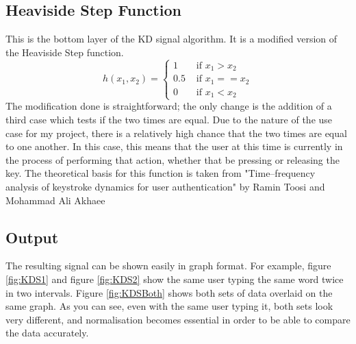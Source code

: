 \documentclass[10pt,a4paper]{report}
\begin{document}
\subsection{Heaviside Step Function}
This is the bottom layer of the KD signal algorithm. It is a modified version of the Heaviside Step function.
\begin{equation}
	h(x_1, x_2) = \begin{cases}
	1 & \text{ if } x_1 > x_2 \\
	0.5 & \text{ if } x_1 == x_2 \\
	0 & \text{ if } x_1 < x_2
\end{cases}
\end{equation}
The modification done is straightforward; the only change is the addition of a third case which tests if the two times are equal. Due to the nature of the use case for my project, there is a relatively high chance that the two times are equal to one another. In this case, this means that the user at this time is currently in the process of performing that action, whether that be pressing or releasing the key. The theoretical basis for this function is taken from "Time–frequency analysis of keystroke dynamics for user authentication" by Ramin Toosi and Mohammad Ali Akhaee\cite{ToosiRamin2021Taok}

\subsection{Output}
The resulting signal can be shown easily in graph format. For example, figure \ref{fig:KDS1} and figure \ref{fig:KDS2} show the same user typing the same word twice in two intervals. Figure \ref{fig:KDSBoth} shows both sets of data overlaid on the same graph. As you can see, even with the same user typing it, both sets look very different, and normalisation becomes essential in order to be able to compare the data accurately. 
\end{document}
